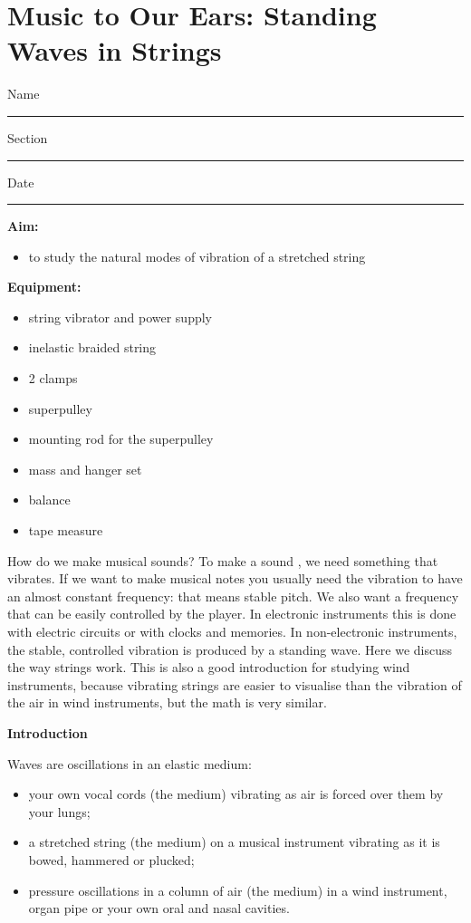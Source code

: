 \section{Music to Our Ears: Standing Waves in Strings}

Name \rule{2.0in}{0.1pt}\hfill{}Section \rule{1.0in}{0.1pt}\hfill{}Date
\rule{1.0in}{0.1pt}

\textbf{Aim:}
\begin{itemize}
\item  to study the natural modes of vibration of a stretched string
\end{itemize}

\textbf{Equipment:}
\begin{itemize}
\item  string vibrator and power supply
\item  inelastic braided string
\item  2 clamps
\item  superpulley
\item  mounting rod for the superpulley
\item  mass and hanger set
\item  balance
\item  tape measure
\end{itemize}


How do we make musical sounds? To make a sound , we need something that vibrates. If we want to make musical notes you usually need the vibration to
have an almost constant frequency: that means stable pitch. We also want a frequency that can be easily controlled by the player. In electronic
instruments this is done with electric circuits or with clocks and memories. In non-electronic instruments, the stable, controlled vibration is
produced by a standing wave. Here we discuss the way strings work. This is also a good introduction for studying wind instruments, because vibrating
strings are easier to visualise than the vibration of the air in wind instruments, but the math is very similar.

\textbf{Introduction}

Waves are oscillations in an elastic medium:

\begin{itemize}
\item  your own vocal cords (the medium) vibrating as air is forced over them by your lungs; 
\item  a stretched string (the medium) on a musical instrument vibrating as it is bowed, hammered or plucked; 
\item  pressure oscillations in a column of air (the medium) in a wind instrument, organ pipe or your own oral and nasal cavities.
\end{itemize}

